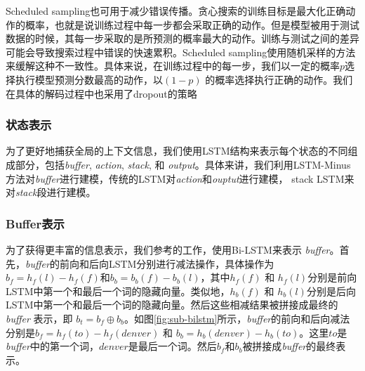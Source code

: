 Scheduled sampling也可用于减少错误传播。贪心搜索的训练目标是最大化正确动作的概率，也就是说训练过程中每一步都会采取正确的动作。但是模型被用于测试数据的时候，其每一步采取的是所预测的概率最大的动作。训练与测试之间的差异可能会导致搜索过程中错误的快速累积。Scheduled sampling使用随机采样的方法来缓解这种不一致性。具体来说，在训练过程中的每一步，我们以一定的概率$p$选择执行模型预测分数最高的动作，以$(1-p)$ 的概率选择执行正确的动作。我们在具体的解码过程中也采用了dropout的策略
\subsubsection{状态表示}

为了更好地捕获全局的上下文信息，我们使用LSTM结构来表示每个状态的不同组成部分，包括\textit{buffer},  \textit{action},  \textit{stack}, 和  \textit{output}。具体来讲，我们利用LSTM-Minus方法对\textit{buffer}进行建模，传统的LSTM对\textit{action}和\textit{ouptut}进行建模， stack LSTM来对\textit{stack}段进行建模。


\subsubsection*{Buffer表示}

为了获得更丰富的信息表示，我们参考的工作，使用Bi-LSTM来表示 \textit{buffer}。首先，\textit{buffer}的前向和后向LSTM分别进行减法操作，具体操作为$b_f=h_f(l)-h_f(f)$和$b_b=b_b(f)-b_b(l)$，其中$h_f(f)$ 和 $h_f(l)$分别是前向LSTM中第一个和最后一个词的隐藏向量。类似地，$h_b(f)$ 和 $h_b(l)$分别是后向LSTM中第一个和最后一个词的隐藏向量。然后这些相减结果被拼接成最终的\textit{buffer} 表示，即 $b_t=b_f \oplus b_b$。如图\ref{fig:sub-bilstm}所示，\textit{buffer}的前向和后向减法分别是$b_f=h_f(to)-h_f(denver)$ 和 $b_b=h_b(denver)-h_b(to)$。这里$to$是\textit{buffer}中的第一个词，$denver$是最后一个词。然后$b_f$和$b_b$被拼接成\textit{buffer}的最终表示。

